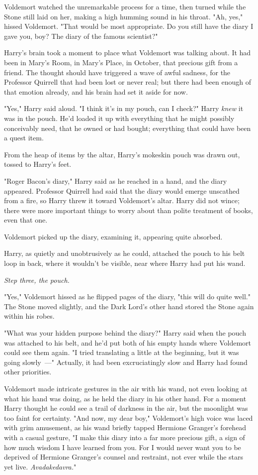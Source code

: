 Voldemort watched the unremarkable process for a time, then turned while the
Stone still laid on her, making a high humming sound in his throat. "Ah, yes,"
hissed Voldemort. "That would be most appropriate. Do you still have the diary
I gave you, boy? The diary of the famous scientist?"

Harry's brain took a moment to place what Voldemort was talking about. It had
been in Mary's Room, in Mary's Place, in October, that precious gift from a
friend. The thought should have triggered a wave of awful sadness, for the
Professor Quirrell that had been lost or never real; but there had been enough
of that emotion already, and his brain had set it aside for now.

"Yes," Harry said aloud. "I think it's in my pouch, can I check?" Harry
\emph{knew} it was in the pouch. He'd loaded it up with everything that he
might possibly conceivably need, that he owned or had bought; everything that
could have been a quest item.

From the heap of items by the altar, Harry's mokeskin pouch was drawn out,
tossed to Harry's feet.

"Roger Bacon's diary," Harry said as he reached in a hand, and the diary
appeared. Professor Quirrell had said that the diary would emerge unscathed
from a fire, so Harry threw it toward Voldemort's altar. Harry did not wince;
there were more important things to worry about than polite treatment of books,
even that one.

Voldemort picked up the diary, examining it, appearing quite absorbed.

Harry, as quietly and unobtrusively as he could, attached the pouch to his belt
loop in back, where it wouldn't be visible, near where Harry had put his wand.

\emph{Step three, the pouch.}

"Yes," Voldemort hissed as he flipped pages of the diary, "this will do quite
well." The Stone moved slightly, and the Dark Lord's other hand stored the
Stone again within his robes.

"What was your hidden purpose behind the diary?" Harry said when the pouch was
attached to his belt, and he'd put both of his empty hands where Voldemort
could see them again. "I tried translating a little at the beginning, but it
was going slowly~---" Actually, it had been excruciatingly slow and Harry had
found other priorities.

 Voldemort made intricate gestures in the air with his wand, not even
looking at what his hand was doing, as he held the diary in his other hand. For
a moment Harry thought he could see a trail of darkness in the air, but the
moonlight was too faint for certainty. "And now, my dear boy," Voldemort's high
voice was laced with grim amusement, as his wand briefly tapped Hermione
Granger's forehead with a casual gesture, "I make this diary into a far more
precious gift, a sign of how much wisdom I have learned from you. For I would
never want you to be deprived of Hermione Granger's counsel and restraint, not
ever while the stars yet live. \emph{Avadakedavra.}"

